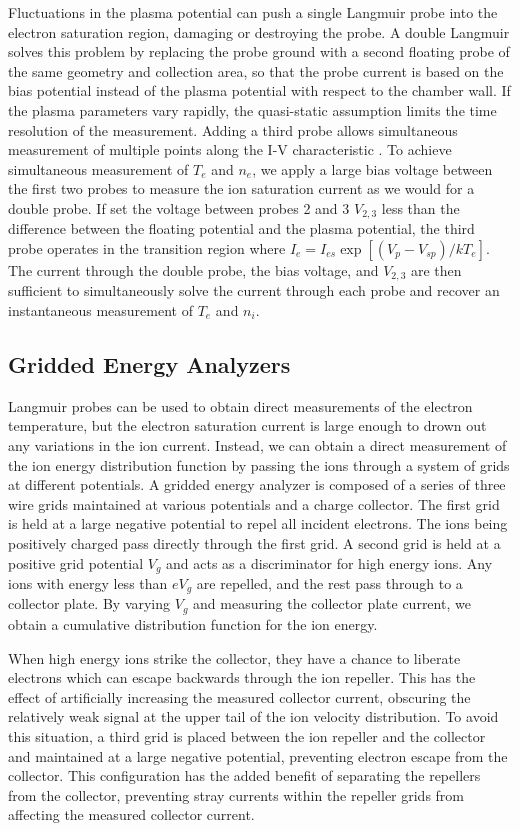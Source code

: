 \documentclass{jpp}
\begin{document}
Fluctuations in the plasma potential can push a single Langmuir probe into the electron saturation region, damaging or destroying the probe. A double Langmuir solves this problem by replacing the probe ground with a second floating probe of the same geometry and collection area, so that the probe current is based on the bias potential instead of the plasma potential with respect to the chamber wall. If the plasma parameters vary rapidly, the quasi-static assumption limits the time resolution of the measurement. Adding a third probe allows simultaneous measurement of multiple points along the I-V characteristic \citep{doi:10.1063/1.1714492}. To achieve simultaneous measurement of $T_e$ and $n_e$, we apply a large bias voltage between the first two probes to measure the ion saturation current as we would for a double probe. If set the voltage between probes 2 and 3 $V_{2,3}$ less than the difference between the floating potential and the plasma potential, the third probe operates in the transition region where $I_e = I_{es} \exp [(V_p - V_{sp})/ k T_e]$. The current through the double probe, the bias voltage, and $V_{2, 3}$ are then sufficient to simultaneously solve the current through each probe and recover an instantaneous measurement of $T_e$ and $n_i$.


\subsection{Gridded Energy Analyzers}

Langmuir probes can be used to obtain direct measurements of the electron temperature, but the electron saturation current is large enough to drown out any variations in the ion current. Instead, we can obtain a direct measurement of the ion energy distribution function by passing the ions through a system of grids at different potentials. A gridded energy analyzer is composed of a series of three wire grids maintained at various potentials and a charge collector. The first grid is held at a large negative potential to repel all incident electrons. The ions being positively charged pass directly through the first grid. A second grid is held at a positive grid potential $V_g$ and acts as a discriminator for high energy ions. Any ions with energy less than $e V_g$ are repelled, and the rest pass through to a collector plate. By varying $V_g$ and measuring the collector plate current, we obtain a cumulative distribution function for the ion energy.

When high energy ions strike the collector, they have a chance to liberate electrons which can escape backwards through the ion repeller. This has the effect of artificially increasing the measured collector current, obscuring the relatively weak signal at the upper tail of the ion velocity distribution. To avoid this situation, a third grid is placed between the ion repeller and the collector and maintained at a large negative potential, preventing electron escape from the collector. This configuration has the added benefit of separating the repellers from the collector, preventing stray currents within the repeller grids from affecting the measured collector current.
\end{document}
